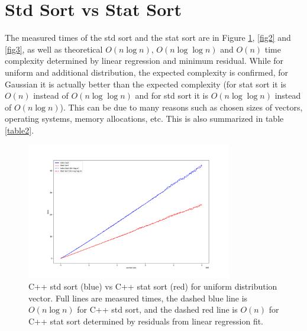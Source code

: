 \documentclass[12pt]{article}
\begin{document}
	\section{Std Sort vs Stat Sort}
	
		The measured times of the std sort and the stat sort are in Figure \ref{fig1}, \ref{fig2} and \ref{fig3}, as well as theoretical $O(n \log n)$, $O(n \log \log n)$ and $O(n)$ time complexity determined by linear regression and minimum residual. While for uniform and additional distribution, the expected complexity is confirmed, for Gaussian it is actually better than the expected complexity (for stat sort it is $O(n)$ instead of $O(n \log \log n)$ and for std sort it is $O(n \log \log n)$ instead of $O(n \log n)$). This can be due to many reasons such as chosen sizes of vectors, operating systems, memory allocations, etc. This is also summarized in table \ref{table2}.

		\begin{figure}
		\begin{center}
			\includegraphics[width=0.8\textwidth]{fig_perf_uniform}
		\end{center}
			\caption{C++ std sort (blue) vs C++ stat sort (red) for uniform distribution vector. Full lines are measured times, the dashed blue line is $O(n \log n)$ for C++ std sort, and the dashed red line is $O(n)$ for C++ stat sort determined by residuals from linear regression fit.}
		
		\label{fig1}
		\end{figure}		
\end{document}
